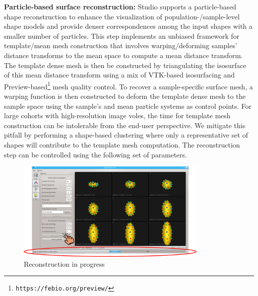 \documentclass[letterpaper,12pt]{article}   %
\begin{document}
\noindent\textbf{Particle-based surface reconstruction:}  Studio supports a particle-based shape reconstruction to enhance the visualization of population-/sample-level shape models and provide denser correspondences among the input shapes with a smaller number of particles. This step implements an unbiased framework for template/mean mesh construction that involves warping/deforming samples' distance transforms to the mean space to compute a mean distance transform. The template dense mesh is then be constructed by triangulating the isosurface of this mean distance transform using a mix of VTK-based isosurfacing and Preview-based\footnote{\texttt{https://febio.org/preview/}} mesh quality control. To recover a sample-specific surface mesh, a warping function is then constructed to deform the template dense mesh to the sample space using the sample’s and mean particle systems as control points. For large cohorts with high-resolution image voles, the time for template mesh construction can be intolerable from the end-user perspective. We mitigate this pitfall by performing a shape-based clustering where only a representative set of shapes will contribute to the template mesh computation. The reconstruction step can be controlled using the following set of parameters. \vspace{0.2in}


\begin{figure}[!htp]
	\centering
	\includegraphics[width=0.82\textwidth]{figs_v2/reconstructing.png}
	\caption{Reconstruction in progress }
	\label{fig:reconstructing}
\end{figure}
\end{document}
